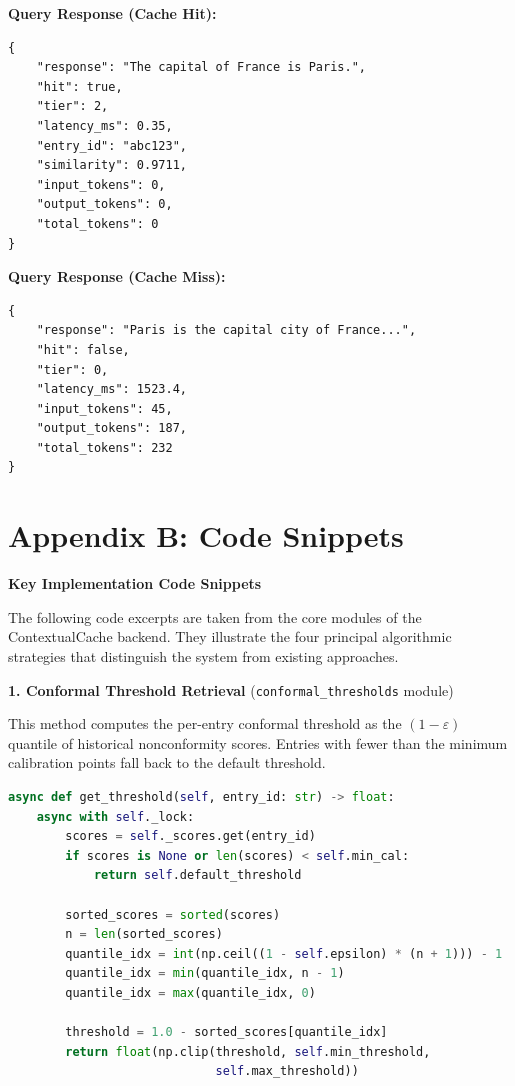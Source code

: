 \documentclass[12pt,a4paper]{report}
\begin{document}
\textbf{Query Response (Cache Hit):}
\begin{lstlisting}
{
    "response": "The capital of France is Paris.",
    "hit": true,
    "tier": 2,
    "latency_ms": 0.35,
    "entry_id": "abc123",
    "similarity": 0.9711,
    "input_tokens": 0,
    "output_tokens": 0,
    "total_tokens": 0
}
\end{lstlisting}

\textbf{Query Response (Cache Miss):}
\begin{lstlisting}
{
    "response": "Paris is the capital city of France...",
    "hit": false,
    "tier": 0,
    "latency_ms": 1523.4,
    "input_tokens": 45,
    "output_tokens": 187,
    "total_tokens": 232
}
\end{lstlisting}

\newpage
\chapter*{Appendix B: Code Snippets}

\noindent\textbf{Key Implementation Code Snippets}

\vspace{0.5cm}

\noindent The following code excerpts are taken from the core modules of the ContextualCache backend. They illustrate the four principal algorithmic strategies that distinguish the system from existing approaches.

\vspace{0.5cm}
\noindent\textbf{1. Conformal Threshold Retrieval} (\texttt{conformal\_thresholds} module)

\noindent This method computes the per-entry conformal threshold as the $(1 - \varepsilon)$ quantile of historical nonconformity scores. Entries with fewer than the minimum calibration points fall back to the default threshold.

\begin{lstlisting}[language=Python]
async def get_threshold(self, entry_id: str) -> float:
    async with self._lock:
        scores = self._scores.get(entry_id)
        if scores is None or len(scores) < self.min_cal:
            return self.default_threshold

        sorted_scores = sorted(scores)
        n = len(sorted_scores)
        quantile_idx = int(np.ceil((1 - self.epsilon) * (n + 1))) - 1
        quantile_idx = min(quantile_idx, n - 1)
        quantile_idx = max(quantile_idx, 0)

        threshold = 1.0 - sorted_scores[quantile_idx]
        return float(np.clip(threshold, self.min_threshold,
                             self.max_threshold))
\end{lstlisting}
\end{document}
